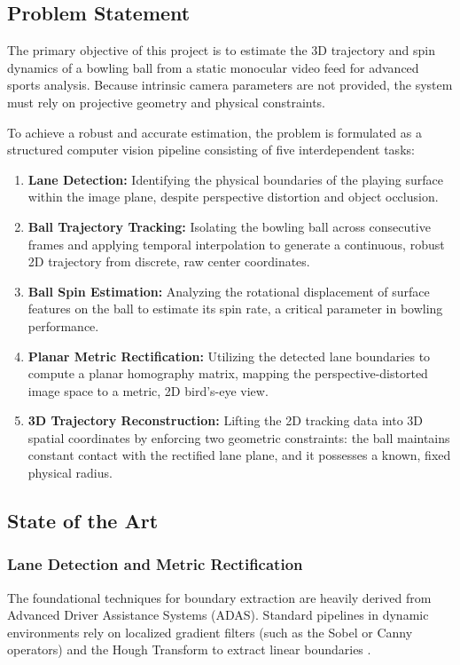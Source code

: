 
\subsection{Problem Statement}
The primary objective of this project is to estimate the 3D trajectory and spin dynamics of a bowling ball from a static monocular video feed for advanced sports analysis. Because intrinsic camera parameters are not provided, the system must rely on projective geometry and physical constraints.

To achieve a robust and accurate estimation, the problem is formulated as a structured computer vision pipeline consisting of five interdependent tasks:

\begin{enumerate}
    \item \textbf{Lane Detection:} Identifying the physical boundaries of the playing surface within the image plane, despite perspective distortion and object occlusion.
    
    \item \textbf{Ball Trajectory Tracking:} Isolating the bowling ball across consecutive frames and applying temporal interpolation to generate a continuous, robust 2D trajectory from discrete, raw center coordinates.

    \item \textbf{Ball Spin Estimation:} Analyzing the rotational displacement of surface features on the ball to estimate its spin rate, a critical parameter in bowling performance.
    
    \item \textbf{Planar Metric Rectification:} Utilizing the detected lane boundaries to compute a planar homography matrix, mapping the perspective-distorted image space to a metric, 2D bird's-eye view.    
        
    \item \textbf{3D Trajectory Reconstruction:} Lifting the 2D tracking data into 3D spatial coordinates by enforcing two geometric constraints: the ball maintains constant contact with the rectified lane plane, and it possesses a known, fixed physical radius.
    
\end{enumerate}


\subsection{State of the Art}
\subsubsection{Lane Detection and Metric Rectification}
The foundational techniques for boundary extraction are heavily derived from Advanced Driver Assistance Systems (ADAS). Standard pipelines in dynamic environments rely on localized gradient filters (such as the Sobel or Canny operators) and the Hough Transform to extract linear boundaries \cite{aly2014lanedetection}.

